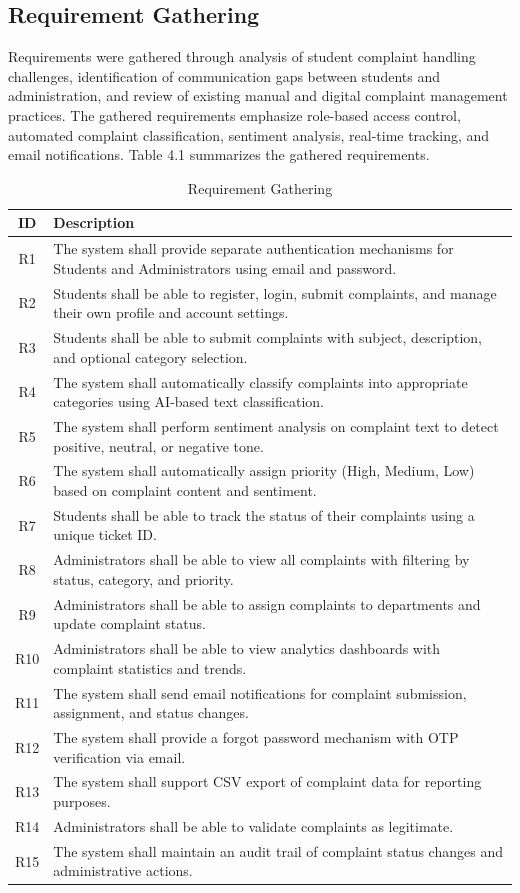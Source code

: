 \documentclass[12pt,a4paper]{report}
\begin{document}
\subsection{Requirement Gathering}
Requirements were gathered through analysis of student complaint handling challenges, identification of communication gaps between students and administration, and review of existing manual and digital complaint management practices. The gathered requirements emphasize role-based access control, automated complaint classification, sentiment analysis, real-time tracking, and email notifications. Table 4.1 summarizes the gathered requirements.

\begin{table}[H]
\centering
\caption{Requirement Gathering}
\begin{tabular}{cp{10cm}}
\toprule
\textbf{ID} & \textbf{Description} \\
\midrule
R1 & The system shall provide separate authentication mechanisms for Students and Administrators using email and password. \\
R2 & Students shall be able to register, login, submit complaints, and manage their own profile and account settings. \\
R3 & Students shall be able to submit complaints with subject, description, and optional category selection. \\
R4 & The system shall automatically classify complaints into appropriate categories using AI-based text classification. \\
R5 & The system shall perform sentiment analysis on complaint text to detect positive, neutral, or negative tone. \\
R6 & The system shall automatically assign priority (High, Medium, Low) based on complaint content and sentiment. \\
R7 & Students shall be able to track the status of their complaints using a unique ticket ID. \\
R8 & Administrators shall be able to view all complaints with filtering by status, category, and priority. \\
R9 & Administrators shall be able to assign complaints to departments and update complaint status. \\
R10 & Administrators shall be able to view analytics dashboards with complaint statistics and trends. \\
R11 & The system shall send email notifications for complaint submission, assignment, and status changes. \\
R12 & The system shall provide a forgot password mechanism with OTP verification via email. \\
R13 & The system shall support CSV export of complaint data for reporting purposes. \\
R14 & Administrators shall be able to validate complaints as legitimate. \\
R15 & The system shall maintain an audit trail of complaint status changes and administrative actions. \\
\bottomrule
\end{tabular}
\end{table}
\end{document}
